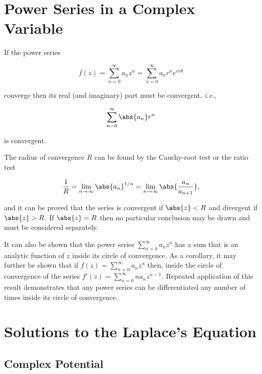 \documentclass[english,a4paper,12pt]{report}
\begin{document}
\section{Power Series in a Complex Variable}

If the power series

\begin{equation}
    f(z) = \sum_{n=0}^{\infty} a_{n}z^{n}  = \sum_{n=0}^{\infty} a_{n}r^{n} e^{in\theta }        
\end{equation}

converge then its real (and imaginary) part must be convergent, \textit{i.e.,}  

\begin{equation}
    \sum_{n=0}^{\infty} \abs{a_{n} }r^{n}   
\end{equation}

is convergent. 

The radius of convergence \(R\) can be found by the Cauchy-root test or the ratio test

\begin{equation}
    \frac{1}{R} = \lim_{n \to \infty} \abs{a_{n}  } ^{1/n} = \lim_{n \to \infty} \abs{\frac{a_{n} }{a_{n+1} } },  
\end{equation}

and it can be proved that the series is convergent if \(\abs{z} <R \) and divergent if \(\abs{z}>R \). If \(\abs{z} =R \) then no particular conclusion may be drawn and must be considered separately.   

It can also be shown that the power series \(\sum_{n=0}^{\infty} a_{n}z^{n}  \) has a sum that is an analytic function of \(z\)  inside its circle of convergence. As a corollary, it may further be shown that if \(f(z) = \sum_{n=0}^{\infty} a_{n}z^{n}  \) then, inside the circle of convergence of the series \(f'(z) = \sum_{n=0}^{\infty} n a_{n} z^{n-1}   \). Repeated application of this result demonstrates that any power series can be differentiated any number of times inside its circle of convergence.




\section{Solutions to the Laplace's Equation}

\subsection{Complex Potential}
\end{document}
